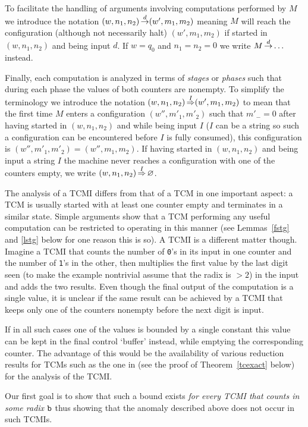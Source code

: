 \documentclass[12pt]{article}
\begin{document}
To facilitate the handling of arguments involving computations performed by
$M$ we introduce the notation $(w,n_1,n_2)\mathop{\to}\limits^{d}(w',m_1,m_2)$ meaning
$M$ will reach the configuration (although not necessarily halt) $(w',m_1,m_2)$ if started in
$(w,n_1,n_2)$ and being input $d$. If $w=q_0$ and $n_1=n_2=0$ we write
$M\mathop{\to}\limits^{d}\ldots$ instead.
 
Finally, each computation is analyzed in terms of {\it stages\/} or
{\it phases\/} such that during each phase the values of both counters
are nonempty. To simplify the terminology we introduce the notation
$(w,n_1,n_2)\mathop{\Rightarrow}\limits^{I}(w',m_1,m_2)$ to mean that the first time $M$ enters
a configuration $(w'',m'_1,m'_2)$ such that $m'_-=0$ after having
started in $(w,n_1,n_2)$ and while being input $I$ ($I$ can be a
string so such a configuration can be encountered before $I$ is fully
consumed), this configuration is $(w'',m'_1,m'_2)=(w'',m_1,m_2)$. If
having started in $(w,n_1,n_2)$ and being input a string $I$ the machine never reaches a
configuration with one of the counters empty, we write $(w,n_1,n_2)\mathop{\Rightarrow}\limits^{I}\varnothing$. 

The analysis of a TCMI differs from that of a TCM in one important
aspect: a TCM is usually started with at least one counter empty and
terminates in a similar state. Simple arguments show that a TCM
performing any useful computation can be restricted to operating in
this manner (see Lemmas~\ref{fstg} and \ref{lstg} below for one
reason this is so). A TCMI is a different matter though. Imagine a
TCMI that counts the number of {\tt 0}'s in its input in one counter and the number
of {\tt 1}'s in the other, then multiplies the first value by the
last digit seen (to make the example nontrivial assume that the radix
is $>2$) in the input and adds the two results. 
Even though the final output of the computation
is a single value, it is 
unclear if the same result can be achieved by a TCMI that keeps only
one of the counters nonempty before the next digit is input. 

If in all such cases
one of the values is bounded by a single constant this value can be
kept in the final control `buffer' instead, while emptying the
corresponding counter. The advantage of this would be the availability 
of various reduction results for TCMs such as the one in
\cite{Schroep} (see the proof of Theorem~\ref{tcexact} below)
for the analysis of the TCMI.

Our first goal is to show that such a bound exists {\it for every TCMI that
counts in some radix ${\tt b}$} thus showing that the anomaly
described above does not occur in such TCMIs.
\end{document}
